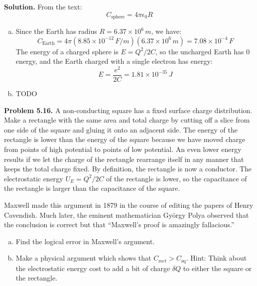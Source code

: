 \documentclass{article}
\begin{document}
\textbf{Solution.} From the text:
\begin{equation}
    C_\text{sphere} = 4\pi\epsilon_0 R\tag{5.37}\label{eq:5.37}
\end{equation}

\begin{enumerate}[(a)]
    \item Since the Earth has radius $R = 6.37\times10^6\,\si{m}$, we have:
    \[
        C_\text{Earth} = 4\pi (8.85\times10^{-12}\,\si{F/m})(6.37\times10^6\,\si{m}) = \boxed{7.08\times 10^{-4}\,\si{F}}
    \]
    The energy of a charged sphere is $E = Q^2/2C$, so the uncharged Earth has 0 energy, and the Earth charged with a single electron has energy:
    \[
        E = \frac{e^2}{2C} = 1.81\times 10^{-35}\,\si{J}
    \]

    \item TODO
\end{enumerate}


\hrulefill

\textbf{Problem 5.16.} A non-conducting square has a fixed surface charge distribution. Make a rectangle with the same area and total charge by cutting off a slice from one side of the square and gluing it onto an adjacent side. The energy of the rectangle is lower than the energy of the square because we have moved charge from points of high potential to points of low potential. An even lower energy results if we let the charge of the rectangle rearrange itself in any manner that keeps the total charge fixed. By definition, the rectangle is now a conductor. The electrostatic energy $U_E = Q^2/2C$ of the rectangle is lower, so the capacitance of the rectangle is larger than the capacitance of the square.

Maxwell made this argument in 1879 in the course of editing the papers of Henry Cavendish. Much later, the eminent mathematician Gy\"{o}rgy Polya observed that the conclusion is correct but that “Maxwell’s proof is amazingly fallacious.”
\begin{enumerate}[(a)]
    \item Find the logical error in Maxwell's argument.
    \item Make a physical argument which shows that $C_{\text{rect}} > C_{\text{sq}}$. Hint: Think about the electrostatic energy cost to add a bit of charge $\delta Q$ to either the square or the rectangle.
\end{enumerate}
\end{document}
